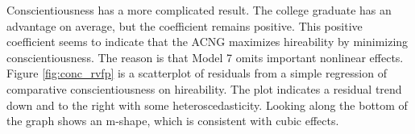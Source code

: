\documentclass[review]{elsarticle}
\begin{document}



Conscientiousness has a more complicated result.
The college graduate has an advantage on average, but the coefficient remains positive.
This positive coefficient seems to indicate that the ACNG maximizes hireability by minimizing conscientiousness.
The reason is that Model 7 omits important nonlinear effects.
Figure \ref{fig:conc_rvfp} is a scatterplot of residuals from a simple regression of comparative conscientiousness on hireability.
The plot indicates a residual trend down and to the right with some heteroscedasticity.
Looking along the bottom of the graph shows an m-shape, which is consistent with cubic effects.
\end{document}
